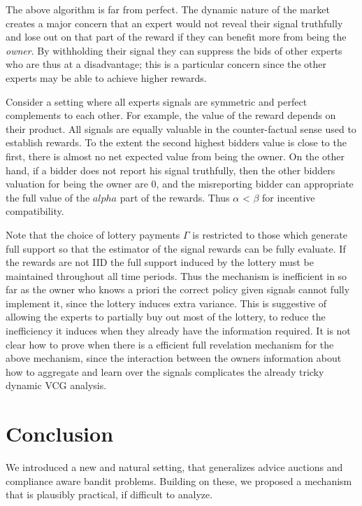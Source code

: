 The above algorithm is far from perfect.
The dynamic nature of the market creates a major concern that an expert would not reveal their signal truthfully and lose out on that part of the reward if they can benefit more from being the \emph{owner}.
By withholding their signal they can suppress the bids of other experts who are thus at a disadvantage; this is a particular concern since the other experts may be able to achieve higher rewards.

Consider a setting where all experts signals are symmetric and perfect complements to each other.
For example, the value of the reward depends on their product.
All signals are equally valuable in the counter-factual sense used to establish rewards.
To the extent the second highest bidders value is close to the first, there is almost no net expected value from being the owner.
On the other hand, if a bidder does not report his signal truthfully, then the other bidders valuation for being the owner are 0, and the misreporting bidder can appropriate the full value of the $alpha$ part of the rewards.
Thus $\alpha$ < $\beta$ for incentive compatibility. 

Note that the choice of lottery payments $\Gamma$ is restricted to those which generate full support so that the estimator of the signal rewards can be fully evaluate. 
If the rewards are not IID the full support induced by the lottery must be maintained throughout all time periods. 
Thus the mechanism is inefficient in so far as the owner who knows a priori the correct policy given signals cannot fully implement it, since the lottery induces extra variance.
This is suggestive of allowing the experts to partially buy out most of the lottery, to reduce the inefficiency it induces when they already have the information required. 
It is not clear how to prove when there is a efficient full revelation mechanism for the above mechanism, since the interaction between the owners information about how to aggregate and learn over the signals complicates the already tricky dynamic VCG analysis. 


\section{Conclusion}

We introduced a new and natural setting, that generalizes advice auctions and compliance aware bandit problems.
Building on these, we proposed a mechanism that is plausibly practical, if difficult to analyze.




